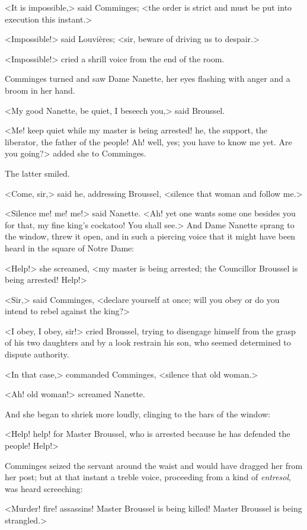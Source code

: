 <It is impossible,> said Comminges; <the order is strict and must be put into execution this instant.>

<Impossible!> said Louvières; <sir, beware of driving us to despair.>

<Impossible!> cried a shrill voice from the end of the room.

Comminges turned and saw Dame Nanette, her eyes flashing with anger and a broom in her hand.

<My good Nanette, be quiet, I beseech you,> said Broussel.

<Me! keep quiet while my master is being arrested! he, the support, the liberator, the father of the people! Ah! well, yes; you have to know me yet. Are you going?> added she to Comminges.

The latter smiled.

<Come, sir,> said he, addressing Broussel, <silence that woman and follow me.>

<Silence me! me! me!> said Nanette. <Ah! yet one wants some one besides you for that, my fine king's cockatoo! You shall see.> And Dame Nanette sprang to the window, threw it open, and in such a piercing voice that it might have been heard in the square of Notre Dame:

<Help!> she screamed, <my master is being arrested; the Councillor Broussel is being arrested! Help!>

<Sir,> said Comminges, <declare yourself at once; will you obey or do you intend to rebel against the king?>

<I obey, I obey, sir!> cried Broussel, trying to disengage himself from the grasp of his two daughters and by a look restrain his son, who seemed determined to dispute authority.

<In that case,> commanded Comminges, <silence that old woman.>

<Ah! old woman!> screamed Nanette.

And she began to shriek more loudly, clinging to the bars of the window:

<Help! help! for Master Broussel, who is arrested because he has defended the people! Help!>

Comminges seized the servant around the waist and would have dragged her from her post; but at that instant a treble voice, proceeding from a kind of \textit{entresol}, was heard screeching:

<Murder! fire! assassins! Master Broussel is being killed! Master Broussel is being strangled.>

